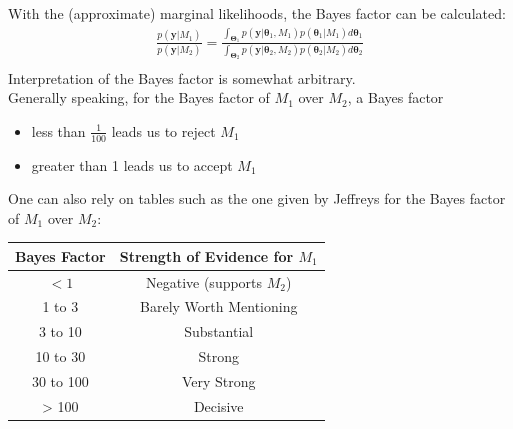 \documentclass{beamer}
\begin{document}
\begin{frame}
With the (approximate) marginal likelihoods, the Bayes factor can be calculated:
\pause
\begin{eqnarray*}
\frac{p(\bm{y} | M_1)}{p(\bm{y} | M_2)} = \frac{\int_{\bm{\Theta}_1} p(\bm{y} | \bm{\theta}_1, M_1) p(\bm{\theta}_1 | M_1) d\bm{\theta}_1}{\int_{\bm{\Theta}_2} p(\bm{y} | \bm{\theta}_2, M_2) p(\bm{\theta}_2 | M_2) d\bm{\theta}_2} \\
\end{eqnarray*}
\pause
\bigskip
Interpretation of the Bayes factor is somewhat arbitrary. \\
\pause 
Generally speaking, for the Bayes factor of $M_1$ over $M_2$, a Bayes factor 
\begin{itemize}
\item less than $\frac{1}{100}$ leads us to reject $M_1$ 
\pause
\item greater than 1 leads us to accept $M_1$
\end{itemize}
\end{frame}

\begin{frame}
One can also rely on tables such as the one given by Jeffreys for the Bayes factor of $M_1$ over $M_2$:
\pause
\bigskip
\begin{table}
\begin{center}
\begin{tabular}{cc}
\hline
Bayes Factor & Strength of Evidence for $M_1$\\
\hline
$< 1$ & Negative (supports $M_2$)\\
1 to 3 & Barely Worth Mentioning \\
3 to 10 & Substantial \\
10 to 30 & Strong \\
30 to 100 & Very Strong \\ 
> 100 & Decisive \\
\hline
\end{tabular}
\end{center}
\end{table}
\end{frame}
\end{document}
